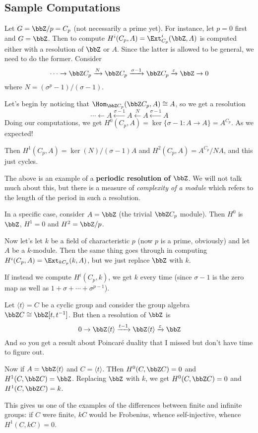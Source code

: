 \documentclass[12pt]{article}
\begin{document}
\subsection{Sample Computations}
\begin{ex}
	Let $G=\bbZ/p=C_p$ (not necessarily a prime yet). For instance, let $p=0$ first and $G=\bbZ$.
	Then to compute $H^i(C_p,A)=\Ext_{C_p}^i(\bbZ,A)$ is computed either with a resolution of $\bbZ$ or $A$. Since the 
	latter is allowed to be general, we need to do the former. Consider 
	\[\cdots\to\bbZ C_p\xrightarrow{N}\bbZ C_p\xrightarrow{\sigma-1}\bbZ C_p\xrightarrow{\varepsilon}\bbZ\to 0\]
	where $N=(\sigma^p-1)/(\sigma-1)$.

	Let's begin by noticing that $\Hom_{\bbZ C_p}(\bbZ C_p,A)\cong A$, so we get a resolution 
	\[\cdots\leftarrow A\xleftarrow{\sigma-1}A\xleftarrow{N}A\xleftarrow{\sigma-1}A\]
	Doing our computations, we get $H^0(C_p,A)=\ker\{\sigma-1:A\to A\}=A^{C_p}$. As we expected!

	Then $H^1(C_p,A)=\ker(N)/(\sigma-1)A$ and $H^2(C_p,A)=A^{C_p}/NA$, and this just cycles.
\end{ex}
\begin{rmk}
	The above is an example of a \textbf{periodic resolution of $\bbZ$}. We will not talk much about this, but there is a measure of 
	\textit{complexity of a module} which refers to the length of the period in such a resolution.
\end{rmk}

\begin{ex}
	In a specific case, consider $A=\bbZ$ (the trivial $\bbZ C_p$ module). Then $H^0$ is $\bbZ$, $H^1=0$ and $H^2=\bbZ/p$.
\end{ex}
\begin{ex}
	Now let's let $k$ be a field of characteristic $p$ (now $p$ is a prime, obviously) and let $A$ be a $k$-module. 
	Then the same thing goes through in computing $H^i(C_p,A)=\Ext_{kC_p}(k,A)$, but we just replace $\bbZ$ with $k$.

	If instead we compute $H^i(C_p,k)$, we get $k$ every time (since $\sigma-1$ is the zero map as well as $1+\sigma+\cdots+\sigma^{p-1}$).
\end{ex}
\begin{ex}
	Let $\langle t\rangle=C$ be a cyclic group and consider the group algebra $\bbZ C\cong \bbZ[t,t^{-1}]$.
	But then a resolution of $\bbZ$ is 
	\[0\to \bbZ\langle t\rangle\xrightarrow{t-1}\bbZ\langle t\rangle\xrightarrow{\varepsilon}\bbZ\]
	And so you get a result about Poincar\'e duality that I missed but don't have time to figure out.
\end{ex}
\begin{ex}
	Now if $A=\bbZ\langle t\rangle$ and $C=\langle t\rangle$. THen $H^0(C,\bbZ C)=0$ and $H^1(C,\bbZ C)=\bbZ$.
	Replacing $\bbZ$ with $k$, we get $H^0(C,\bbZ C)=0$ and $H^1(C,\bbZ C)=k$.
\end{ex}
\begin{rmk}
	This gives us one of the examples of the differences between finite and infinite groups: if $C$ were finite,
	$kC$ would be Frobenius, whence self-injective, whence $H^1(C,kC)=0$.
\end{rmk}
\end{document}
